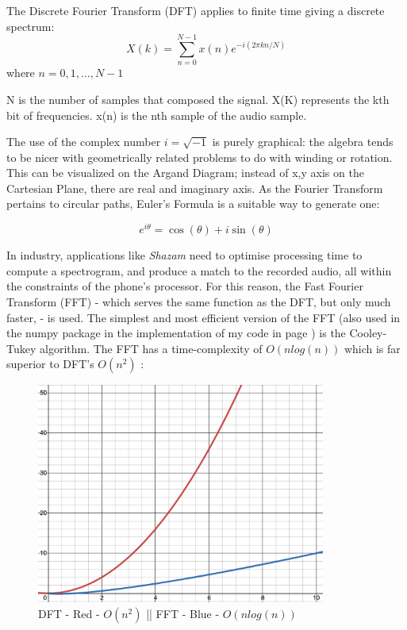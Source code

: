 \documentclass[a4paper,12pt]{article}
\begin{document}
\noindent The Discrete Fourier Transform (DFT) applies to finite time giving a discrete spectrum:
\LARGE
\[ X(k) =\sum_{n=0}^{N-1} x(n)e^{-i(2 \pi k n/  N)} \] \normalsize where $n = 0, 1, ..., N-1$ \newline

N is the number of samples that composed the signal.
X(K) represents the kth bit of frequencies.
x(n) is the nth sample of the audio sample.

The use of the complex number $i = \sqrt{-1}$ is purely graphical: the algebra tends to be nicer with geometrically related problems to do with winding or rotation. This can be 
visualized on the Argand Diagram; instead of x,y axis on the Cartesian Plane, there are real and imaginary axis. As the Fourier Transform pertains to circular paths, Euler's Formula is
a suitable way to generate one:

\LARGE
\[ e^{i\theta} = \cos(\theta) + i\sin(\theta)\]

\newpage
\normalsize
In industry, applications like \textit{Shazam} need to optimise processing time to compute a spectrogram, and produce a match to the recorded audio, all within the constraints of the phone's
processor. For this reason, the Fast Fourier Transform (FFT) - which serves the same function as the DFT, but only much faster, - is used. The simplest and most efficient version of the FFT (also used in the numpy package in the implementation of my code in page \pageref{FTimplementation})
is the Cooley-Tukey algorithm. The FFT has a time-complexity of $O(nlog(n))$ which is far superior to DFT's $O(n^2)$ \parencite{CooleyTukey}:

\begin{figure}[h!]
    \centering
    \includegraphics[width=9.5cm]{big0 dft vs fft.png}
    \caption{DFT - Red - $O(n^2)$ || FFT - Blue - $O(nlog(n))$}        
\end{figure}
\end{document}
